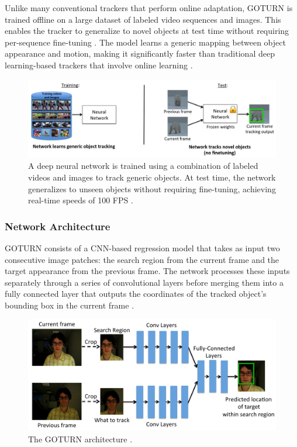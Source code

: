 Unlike many conventional trackers that perform online adaptation, GOTURN is trained offline on a large dataset of labeled video sequences and images. This enables the tracker to generalize to novel objects at test time without requiring per-sequence fine-tuning \cite{held2016learning}. The model learns a generic mapping between object appearance and motion, making it significantly faster than traditional deep learning-based trackers that involve online learning \cite{held2016learning}.

\begin{figure}[h]
    \centering
    \includegraphics[width=1\linewidth]{images/GOTURN_OVERVIEW.png}
    \caption{A deep neural network is trained using a combination of labeled videos and images to track generic objects. At test time, the network generalizes to unseen objects without requiring fine-tuning, achieving real-time speeds of 100 FPS \cite{held2016learning}.}
    \label{fig:goturn_overview}
\end{figure}

\subsubsection{Network Architecture}
GOTURN consists of a CNN-based regression model that takes as input two consecutive image patches: the search region from the current frame and the target appearance from the previous frame. The network processes these inputs separately through a series of convolutional layers before merging them into a fully connected layer that outputs the coordinates of the tracked object's bounding box in the current frame \cite{held2016learning}.

\begin{figure}[h]
    \centering
    \includegraphics[width=1\linewidth]{images/goturn-architecture.png}
    \caption{The GOTURN architecture \cite{held2016learning}.}
    \label{fig:goturn_architecture}
\end{figure}

